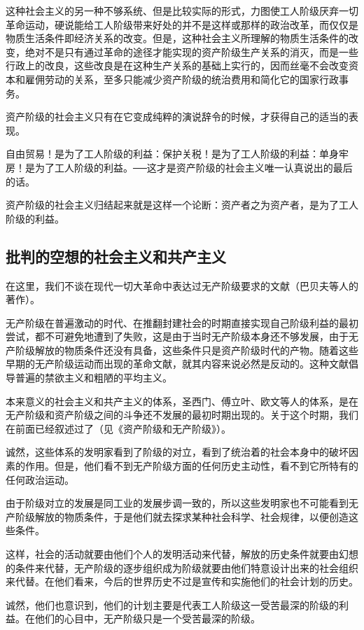 \documentclass[UTF8]{ctexart}
\begin{document}
这种社会主义的另一种不够系统、但是比较实际的形式，力图使工人阶级厌弃一切革命运动，硬说能给工人阶级带来好处的并不是这样或那样的政治改革，而仅仅是物质生活条件即经济关系的改变。但是，这种社会主义所理解的物质生活条件的改变，绝对不是只有通过革命的途径才能实现的资产阶级生产关系的消灭，而是一些行政上的改良，这些改良是在这种生产关系的基础上实行的，因而丝毫不会改变资本和雇佣劳动的关系，至多只能减少资产阶级的统治费用和简化它的国家行政事务。

资产阶级的社会主义只有在它变成纯粹的演说辞令的时候，才获得自己的适当的表现。

自由贸易！是为了工人阶级的利益：保护关税！是为了工人阶级的利益：单身牢房！是为了工人阶级的利益。──这才是资产阶级的社会主义唯一认真说出的最后的话。

资产阶级的社会主义归结起来就是这样一个论断：资产者之为资产者，是为了工人阶级的利益。

\subsection{批判的空想的社会主义和共产主义}

在这里，我们不谈在现代一切大革命中表达过无产阶级要求的文献（巴贝夫等人的著作）。

无产阶级在普遍激动的时代、在推翻封建社会的时期直接实现自己阶级利益的最初尝试，都不可避免地遭到了失败，这是由于当时无产阶级本身还不够发展，由于无产阶级解放的物质条件还没有具备，这些条件只是资产阶级时代的产物。随着这些早期的无产阶级运动而出现的革命文献，就其内容来说必然是反动的。这种文献倡导普遍的禁欲主义和粗陋的平均主义。

本来意义的社会主义和共产主义的体系，圣西门、傅立叶、欧文等人的体系，是在无产阶级和资产阶级之间的斗争还不发展的最初时期出现的。关于这个时期，我们在前面已经叙述过了（见《资产阶级和无产阶级》）。

诚然，这些体系的发明家看到了阶级的对立，看到了统治着的社会本身中的破坏因素的作用。但是，他们看不到无产阶级方面的任何历史主动性，看不到它所特有的任何政治运动。

由于阶级对立的发展是同工业的发展步调一致的，所以这些发明家也不可能看到无产阶级解放的物质条件，于是他们就去探求某种社会科学、社会规律，以便创造这些条件。

这样，社会的活动就要由他们个人的发明活动来代替，解放的历史条件就要由幻想的条件来代替，无产阶级的逐步组织成为阶级就要由他们特意设计出来的社会组织来代替。在他们看来，今后的世界历史不过是宣传和实施他们的社会计划的历史。

诚然，他们也意识到，他们的计划主要是代表工人阶级这一受苦最深的阶级的利益。在他们的心目中，无产阶级只是一个受苦最深的阶级。
\end{document}
